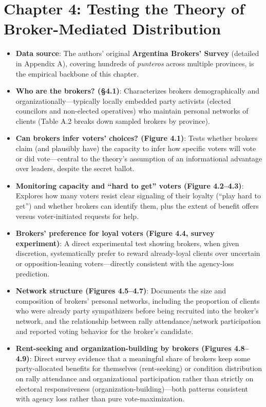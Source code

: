 \documentclass[12pt]{article}
\begin{document}
\section{Chapter 4: Testing the Theory of Broker-Mediated Distribution}

\begin{itemize}[leftmargin=*, itemsep=4pt]
    \item \textbf{Data source}: The authors' original \textbf{Argentina Brokers' Survey} (detailed in Appendix A), covering hundreds of \emph{punteros} across multiple provinces, is the empirical backbone of this chapter.
    \item \textbf{Who are the brokers? (\S4.1)}: Characterizes brokers demographically and organizationally---typically locally embedded party activists (elected councilors and non-elected operatives) who maintain personal networks of clients (Table A.2 breaks down sampled brokers by province).
    \item \textbf{Can brokers infer voters' choices? (Figure 4.1)}: Tests whether brokers claim (and plausibly have) the capacity to infer how specific voters will vote or did vote---central to the theory's assumption of an informational advantage over leaders, despite the secret ballot.
    \item \textbf{Monitoring capacity and ``hard to get'' voters (Figure 4.2--4.3)}: Explores how many voters resist clear signaling of their loyalty (``play hard to get'') and whether brokers can identify them, plus the extent of benefit offers versus voter-initiated requests for help.
    \item \textbf{Brokers' preference for loyal voters (Figure 4.4, survey experiment)}: A direct experimental test showing brokers, when given discretion, systematically prefer to reward already-loyal clients over uncertain or opposition-leaning voters---directly consistent with the agency-loss prediction.
    \item \textbf{Network structure (Figures 4.5--4.7)}: Documents the size and composition of brokers' personal networks, including the proportion of clients who were already party sympathizers before being recruited into the broker's network, and the relationship between rally attendance/network participation and reported voting behavior for the broker's candidate.
    \item \textbf{Rent-seeking and organization-building by brokers (Figures 4.8--4.9)}: Direct survey evidence that a meaningful share of brokers keep some party-allocated benefits for themselves (rent-seeking) or condition distribution on rally attendance and organizational participation rather than strictly on electoral responsiveness (organization-building)---both patterns consistent with agency loss rather than pure vote-maximization.

\end{itemize}
\end{document}
